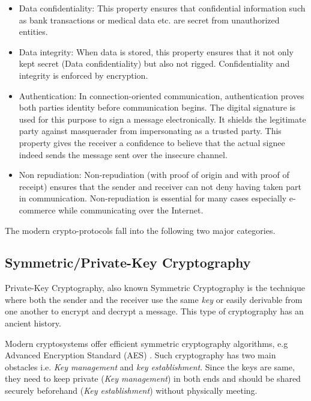 \begin{itemize}
\item Data confidentiality:
This property ensures that confidential information such as bank transactions or medical data etc. are secret from unauthorized entities. 

\item Data integrity:
When data is stored, this property ensures that it not only kept secret (Data confidentiality) but also not rigged.
Confidentiality and integrity is enforced by encryption.

\item Authentication:
In connection-oriented communication, authentication proves both parties identity before communication begins.
The digital signature is used for this purpose to sign a message electronically.
It shields the legitimate party against masquerader from impersonating as a trusted party.
This property gives the receiver a confidence to believe that the actual signee indeed sends the message sent over the insecure channel.

\item Non repudiation:
Non-repudiation (with proof of origin and with proof of receipt) ensures that the sender and receiver can not deny having taken part in communication.
Non-repudiation is essential for many cases especially e-commerce while communicating over the Internet.
\end{itemize}

The modern crypto-protocols fall into the following two major categories. 

\subsection{Symmetric/Private-Key Cryptography}
Private-Key Cryptography, also known Symmetric Cryptography is the technique where both the sender and the receiver use the same \textit{key} or easily derivable from one another to encrypt and decrypt a message.
This type of cryptography has an ancient history. 

Modern cryptosystems offer efficient symmetric cryptography algorithms, e.g Advanced Encryption Standard (AES) \cite{AES_DaemenR02}.
Such cryptography has two main obstacles i.e. \textit{Key management} and \textit{key establishment}.
Since the keys are same, they need to keep private (\textit{Key management})  in both ends and should be shared securely beforehand (\textit{Key establishment}) without physically meeting.

